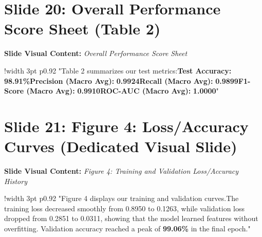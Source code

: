 \documentclass[11pt]{article}
\begin{document}
\section{Slide 20: Overall Performance Score Sheet (Table 2)}
\textbf{Slide Visual Content:} \textit{Overall Performance Score Sheet}\\ [8pt]
\noindent
\begin{tabular}{!{\color{primary}\vrule width 3pt} p{0.92\textwidth}}
  \small\color{black!80} "Table 2 summarizes our test metrics:\newline\newline *   \textbf{Test Accuracy:} \textbf{98.91\%}\newline\newline *   \textbf{Precision (Macro Avg):} \textbf{0.9924}\newline\newline *   \textbf{Recall (Macro Avg):} \textbf{0.9899}\newline\newline *   \textbf{F1-Score (Macro Avg):} \textbf{0.9910}\newline\newline *   \textbf{ROC-AUC (Macro Avg):} \textbf{1.0000}"
\end{tabular}
\vspace{15pt}

\section{Slide 21: Figure 4: Loss/Accuracy Curves (Dedicated Visual Slide)}
\textbf{Slide Visual Content:} \textit{Figure 4: Training and Validation Loss/Accuracy History}\\ [8pt]
\noindent
\begin{tabular}{!{\color{primary}\vrule width 3pt} p{0.92\textwidth}}
  \small\color{black!80} "Figure 4 displays our training and validation curves.\newline\newline The training loss decreased smoothly from 0.8950 to 0.1263, while validation loss dropped from 0.2851 to 0.0311, showing that the model learned features without overfitting. Validation accuracy reached a peak of \textbf{99.06\%} in the final epoch."
\end{tabular}
\vspace{15pt}
\end{document}
